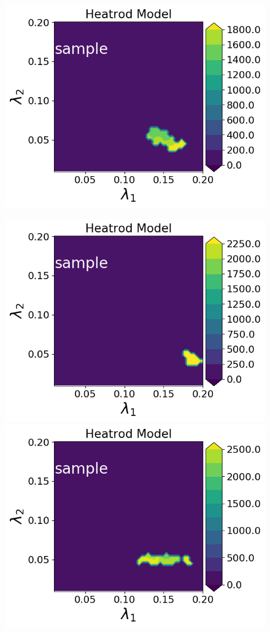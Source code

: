 \begin{figure}[h]
\begin{minipage}{.4\textwidth}
\includegraphics[width=\linewidth]{examples/fig_heatrod_q1/tHeatrodModel--sample_N500_mc.png}

\includegraphics[width=\linewidth]{examples/fig_heatrod_q2/tHeatrodModel--sample_N50_mc.png}
\includegraphics[width=\linewidth]{examples/fig_heatrod_q2/tHeatrodModel--sample_N500_mc.png}
\end{minipage}


\end{figure}
